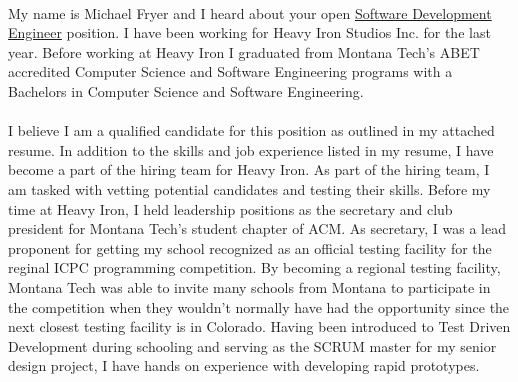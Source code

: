 \paragraph{}
My name is Michael Fryer and I heard about your open \href{https://digitalglobe.wd1.myworkdayjobs.com/en-US/MAXAR/job/Westminster-CO/Software-Development-Engineer_R09895?utm_source=Maxar-careers&utm_medium=website#path=}{Software Development Engineer} position. I have been working for Heavy Iron Studios Inc. for the last year. Before working at Heavy Iron I graduated from Montana Tech's ABET accredited Computer Science and Software Engineering programs with a Bachelors in Computer Science and Software Engineering.

\paragraph{}
I believe I am a qualified candidate for this position as outlined in my attached resume. In addition to the skills and job experience listed in my resume, I have become a part of the hiring team for Heavy Iron. As part of the hiring team, I am tasked with vetting potential candidates and testing their skills. Before my time at Heavy Iron, I held leadership positions as the secretary and club president for Montana Tech's student chapter of ACM. As secretary, I was a lead proponent for getting my school recognized as an official testing facility for the reginal ICPC programming competition. By becoming a regional testing facility, Montana Tech was able to invite many schools from Montana to participate in the competition when they wouldn't normally have had the opportunity since the next closest testing facility is in Colorado. Having been introduced to Test Driven Development during schooling and serving as the SCRUM master for my senior design project, I have hands on experience with developing rapid prototypes.